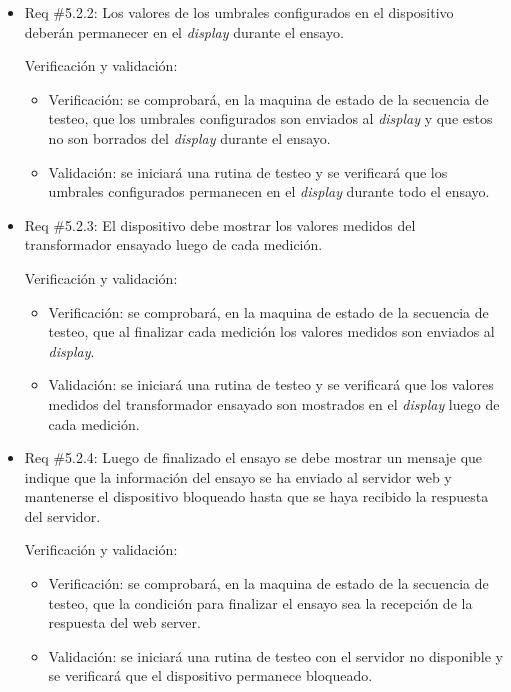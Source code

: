 \documentclass[11pt]{charter}
\begin{document}
\begin{itemize} 
\item Req \#5.2.2: Los valores de los umbrales configurados en el dispositivo deberán permanecer en el \textit{display} durante el ensayo.

Verificación y validación:

\begin{itemize}
\item Verificación: se comprobará, en la maquina de estado de la secuencia de testeo, que los umbrales configurados son enviados al \textit{display} y que estos no son borrados del \textit{display} durante el ensayo.
\item Validación: se iniciará una rutina de testeo y se verificará que los umbrales configurados permanecen en el \textit{display} durante todo el ensayo.  
\end{itemize}

\end{itemize}

\begin{itemize} 
\item Req \#5.2.3: El dispositivo debe mostrar los valores medidos del transformador ensayado luego de cada medición.

Verificación y validación:

\begin{itemize}
\item Verificación: se comprobará, en la maquina de estado de la secuencia de testeo, que al finalizar cada medición los valores medidos son enviados al \textit{display}.
\item Validación: se iniciará una rutina de testeo y se verificará que los valores medidos del transformador ensayado son mostrados en el \textit{display} luego de cada medición.   
\end{itemize}

\end{itemize}

\begin{itemize} 
\item Req \#5.2.4: Luego de finalizado el ensayo se debe mostrar un mensaje que indique que la información del ensayo se ha enviado al servidor web y mantenerse el dispositivo bloqueado hasta que se haya recibido la respuesta del servidor.

Verificación y validación:

\begin{itemize}
\item Verificación: se comprobará, en la maquina de estado de la secuencia de testeo, que la condición para finalizar el ensayo sea la recepción de la respuesta del web server.
\item Validación: se iniciará una rutina de testeo con el servidor no disponible y se verificará que el dispositivo permanece bloqueado.
\end{itemize}

\end{itemize}
\end{document}
